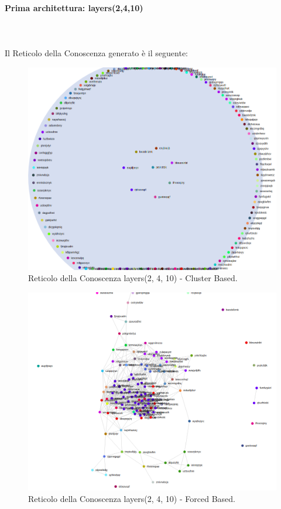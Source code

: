 \paragraph{Prima architettura: layers(2,4,10)}\mbox{}\\\\
\label{Prima architettura}
\noindent
Il Reticolo della Conoscenza generato è il seguente:
\begin{figure}[H]
\centering
	\includegraphics[width=0.70\linewidth]{./image/sql(2,4,10).png}
	\caption{Reticolo della Conoscenza layers(2, 4, 10) - Cluster Based.}
	\label{Reticolo della Conoscenza layers(2, 4, 10) - Cluster Based.}
\end{figure}
\noindent
\begin{figure}[H]
\centering
	\includegraphics[width=0.70\linewidth]{./image/sql(2,4,10)_forced.png}
	\caption{Reticolo della Conoscenza layers(2, 4, 10) - Forced Based.}
	\label{Reticolo della Conoscenza layers(2, 4, 10) - Forced Based.}
\end{figure}
\noindent


